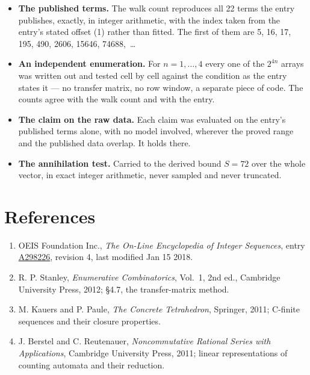 \documentclass[11pt]{article}
\theoremstyle{definition}
\begin{document}
\begin{itemize}

\item {\bfseries The published terms.} The walk count reproduces all 22 terms the entry publishes, exactly, in integer arithmetic, with the index taken from the entry's stated offset (1) rather than fitted. The first of them are 5, 16, 17, 195, 490, 2606, 15646, 74688,~\dots

\item {\bfseries An independent enumeration.} For $n = 1,\dots,4$ every one of the $2^{4n}$ arrays was written out and tested cell by cell against the condition as the entry states it --- no transfer matrix, no row window, a separate piece of code. The counts agree with the walk count and with the entry.

\item {\bfseries The claim on the raw data.} Each claim was evaluated on the entry's published terms alone, with no model involved, wherever the proved range and the published data overlap. It holds there.

\item {\bfseries The annihilation test.} Carried to the derived bound $S = 72$ over the whole vector, in exact integer arithmetic, never sampled and never truncated.

\end{itemize}

\section{References}

\begin{enumerate}

\item OEIS Foundation Inc., \emph{The On-Line Encyclopedia of Integer Sequences}, entry \href{https://oeis.org/A298226}{A298226}, revision 4, last modified Jan 15 2018.

\item R. P. Stanley, \emph{Enumerative Combinatorics}, Vol.~1, 2nd ed., Cambridge University Press, 2012; \S4.7, the transfer-matrix method.

\item M. Kauers and P. Paule, \emph{The Concrete Tetrahedron}, Springer, 2011; C-finite sequences and their closure properties.

\item J. Berstel and C. Reutenauer, \emph{Noncommutative Rational Series with Applications}, Cambridge University Press, 2011; linear representations of counting automata and their reduction.

\end{enumerate}
\end{document}
